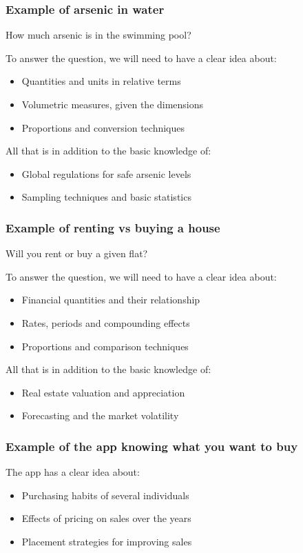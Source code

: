 \documentclass[11pt]{article}
\begin{document}
\subsubsection{Example of arsenic in water}
\label{sec:orgbe265f5}
How much arsenic is in the swimming pool?

To answer the question, we will need to have a clear idea about:
\begin{itemize}
\item Quantities and units in relative terms
\item Volumetric measures, given the dimensions
\item Proportions and conversion techniques
\end{itemize}

All that is in addition to the basic knowledge of:
\begin{itemize}
\item Global regulations for safe arsenic levels
\item Sampling techniques and basic statistics
\end{itemize}

\subsubsection{Example of renting vs buying a house}
\label{sec:orgcc98c9b}
Will you rent or buy a given flat?

To answer the question, we will need to have a clear idea about:
\begin{itemize}
\item Financial quantities and their relationship
\item Rates, periods and compounding effects
\item Proportions and comparison techniques
\end{itemize}

All that is in addition to the basic knowledge of:
\begin{itemize}
\item Real estate valuation and appreciation
\item Forecasting and the market volatility
\end{itemize}

\subsubsection{Example of the app knowing what you want to buy}
\label{sec:orgc030495}
The app has a clear idea about:
\begin{itemize}
\item Purchasing habits of several individuals
\item Effects of pricing on sales over the years
\item Placement strategies for improving sales
\end{itemize}
\end{document}

